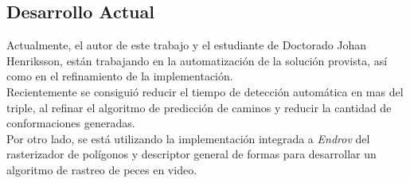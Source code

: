 \subsection*{Desarrollo Actual}

Actualmente, el autor de este trabajo y el estudiante de Doctorado Johan Henriksson,
est\'an trabajando en la automatizaci\'on de la soluci\'on provista, as\'i como
en el refinamiento de la implementaci\'on.\\
Recientemente se consigui\'o reducir el tiempo de detecci\'on autom\'atica en mas
del triple, al refinar el algoritmo de predicci\'on de caminos y reducir la cantidad
de conformaciones generadas.\\

Por otro lado, se est\'a utilizando la implementaci\'on integrada a \emph{Endrov}
del rasterizador de pol\'igonos y descriptor general de formas para desarrollar
un algoritmo de rastreo de peces en video.








